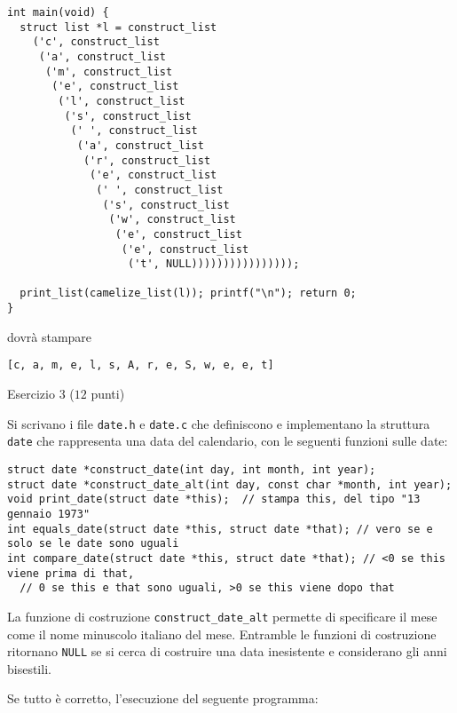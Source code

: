 \documentclass[12pt]{article}
\begin{document}
{\small
\begin{verbatim}
int main(void) {
  struct list *l = construct_list
    ('c', construct_list
     ('a', construct_list
      ('m', construct_list
       ('e', construct_list
        ('l', construct_list
         ('s', construct_list
          (' ', construct_list
           ('a', construct_list
            ('r', construct_list
             ('e', construct_list
              (' ', construct_list
               ('s', construct_list
                ('w', construct_list
                 ('e', construct_list
                  ('e', construct_list
                   ('t', NULL))))))))))))))));
			 
  print_list(camelize_list(l)); printf("\n"); return 0;
}
\end{verbatim}}

\noindent
dovr\`a stampare
%
{\small
\begin{verbatim}
[c, a, m, e, l, s, A, r, e, S, w, e, e, t]
\end{verbatim}}

\vspace*{1ex}
\begin{center}{\Large Esercizio 3} ($12$ punti)\end{center}
%
Si scrivano i file \texttt{date.h} e \texttt{date.c} che definiscono e implementano la struttura
\texttt{date} che rappresenta una data del calendario, con le seguenti funzioni sulle date:

{\small
\begin{verbatim}
struct date *construct_date(int day, int month, int year);
struct date *construct_date_alt(int day, const char *month, int year);
void print_date(struct date *this);  // stampa this, del tipo "13 gennaio 1973"
int equals_date(struct date *this, struct date *that); // vero se e solo se le date sono uguali
int compare_date(struct date *this, struct date *that); // <0 se this viene prima di that,
  // 0 se this e that sono uguali, >0 se this viene dopo that
\end{verbatim}}

\noindent
La funzione di costruzione \texttt{construct\_date\_alt} permette di specificare il mese
come il nome minuscolo italiano del mese. Entramble le funzioni di costruzione
ritornano \texttt{NULL} se si
cerca di costruire una data inesistente e considerano gli anni bisestili.

Se tutto \`e corretto, l'esecuzione del seguente programma:
\end{document}
